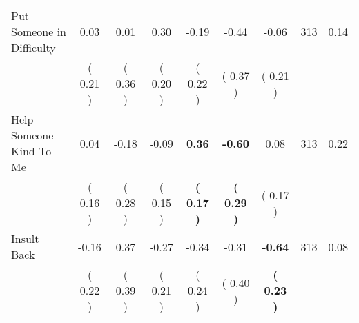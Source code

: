 \begin{tabular}{lcccccccc}
Put Someone in Difficulty &      0.03 &      0.01 &      0.30 &     -0.19 &     -0.44 &     -0.06 & 313 &       0.14 \\ 
 & (     0.21 ) & (     0.36 ) & (     0.20 ) & (     0.22 ) & (     0.37 ) & (     0.21 ) & \\
Help Someone Kind To Me &      0.04 &     -0.18 &     -0.09 & \textbf{     0.36} & \textbf{    -0.60} &      0.08 & 313 &       0.22 \\ 
 & (     0.16 ) & (     0.28 ) & (     0.15 ) & \textbf{(     0.17 )} & \textbf{(     0.29 )} & (     0.17 ) & \\
Insult Back &     -0.16 &      0.37 &     -0.27 &     -0.34 &     -0.31 & \textbf{    -0.64} & 313 &       0.08 \\ 
 & (     0.22 ) & (     0.39 ) & (     0.21 ) & (     0.24 ) & (     0.40 ) & \textbf{(     0.23 )} & \\
\bottomrule
\end{tabular}
